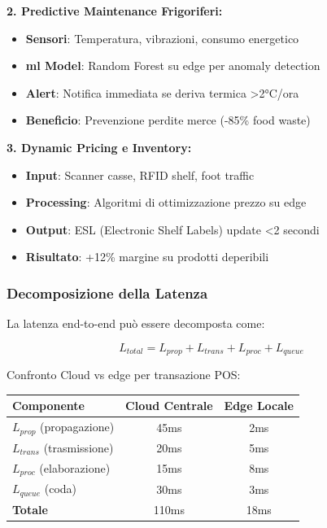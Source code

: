 \textbf{2. Predictive Maintenance Frigoriferi:}
\begin{itemize}
    \item \textbf{Sensori}: Temperatura, vibrazioni, consumo energetico
    \item \textbf{\gls{ml} Model}: Random Forest su edge per anomaly detection
    \item \textbf{Alert}: Notifica immediata se deriva termica >2°C/ora
    \item \textbf{Beneficio}: Prevenzione perdite merce (-85\% food waste)
\end{itemize}

\textbf{3. Dynamic Pricing e Inventory:}
\begin{itemize}
    \item \textbf{Input}: Scanner casse, RFID shelf, foot traffic
    \item \textbf{Processing}: Algoritmi di ottimizzazione prezzo su edge
    \item \textbf{Output}: ESL (Electronic Shelf Labels) update <2 secondi
    \item \textbf{Risultato}: +12\% margine su prodotti deperibili
\end{itemize}

\subsubsection{\texorpdfstring{\textbf{Decomposizione della Latenza}}{3.3.2.5 - Decomposizione della Latenza}}

La latenza end-to-end può essere decomposta come:

\begin{equation}
L_{total} = L_{prop} + L_{trans} + L_{proc} + L_{queue}
\end{equation}

Confronto Cloud vs \gls{edge} per transazione POS:

\begin{tabular}{lcc}
\toprule
\textbf{Componente} & \textbf{Cloud Centrale} & \textbf{Edge Locale} \\
\midrule
$L_{prop}$ (propagazione) & 45ms & 2ms \\
$L_{trans}$ (trasmissione) & 20ms & 5ms \\
$L_{proc}$ (elaborazione) & 15ms & 8ms \\
$L_{queue}$ (coda) & 30ms & 3ms \\
\midrule
\textbf{Totale} & 110ms & 18ms \\
\bottomrule
\end{tabular}

